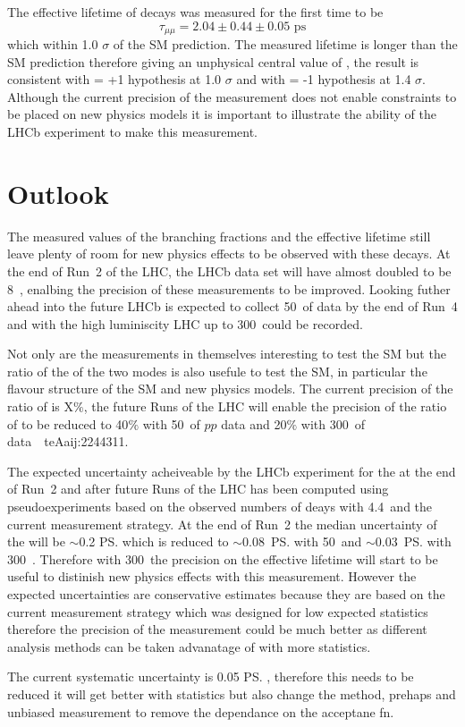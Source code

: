 The effective lifetime of \bsmumu decays was measured for the first time to be 
\begin{equation}
\tau_{\mu\mu} = 2.04 \pm 0.44 \pm 0.05 \text{ ps}
\end{equation}
which within 1.0 $\sigma$ of the SM prediction. The measured lifetime is longer than the SM prediction therefore giving an unphysical central value of \ADG, the result is consistent with \ADG = +1 hypothesis at 1.0 $\sigma$ and with \ADG = -1 hypothesis at 1.4 $\sigma$. Although the current precision of the measurement does not enable constraints to be placed on new physics models it is important to illustrate the ability of the LHCb experiment to make this measurement.


\section{Outlook}
The measured values of the branching fractions and the effective lifetime still leave plenty of room for new physics effects to be observed with these decays. At the end of Run~2 of the LHC, the LHCb data set will have almost doubled to be 8~\fb, enalbing the precision of these measurements to be improved. Looking futher ahead into the future LHCb is expected to collect 50~\fb of data by the end of Run~4 and with the high luminiscity LHC up to 300~\fb could be recorded. 

Not only are the \BF measurements in themselves interesting to test the SM but the ratio of the \BFs of the two modes is also usefule to test the SM, in particular the flavour structure of the SM and new physics models. The current precision of the ratio of \BFs is X$\%$, the future Runs of the LHC will enable the precision of the ratio of \BFs to be reduced to 40$\%$ with 50~\fb of $pp$ data and 20$\%$ with 300~\fb of data~\ci\
te{Aaij:2244311}. 

The expected uncertainty acheiveable by the LHCb experiment for the \el at the end of Run~2 and after future Runs of the LHC has been computed using pseudoexperiments based on the observed numbers of deays with 4.4~\fb and the current measurement strategy. At the end of Run~2 the median uncertainty of the \el will be $\sim$0.2 \ps which is reduced to $\sim$0.08~\ps with 50~\fb and $\sim$0.03~\ps with 300~\fb. Therefore with 300~\fb the precision on the effective lifetime will start to be useful to distinish new physics effects with this measurement. However the expected uncertainties are conservative estimates because they are based on the current measurement strategy which was designed for low expected statistics therefore the precision of the measurement could be much better as different analysis methods can be taken advanatage of with more statistics. 


The current systematic uncertainty is 0.05 \ps, therefore this needs to be reduced it will get better with statistics but also change the method, prehaps and unbiased measurement to remove the dependance on the acceptane fn. 
